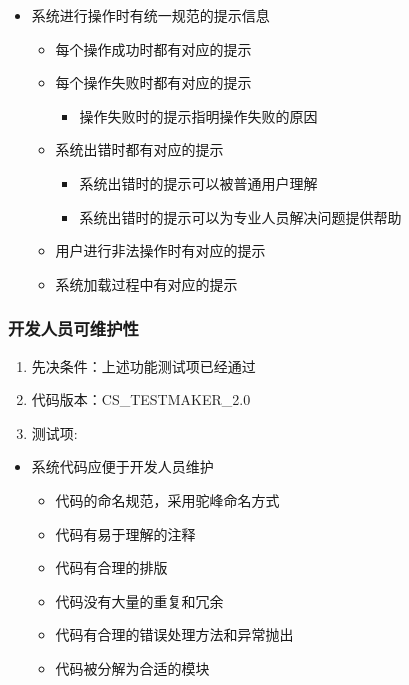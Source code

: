 \documentclass[hyperref, a4paper]{ctexart}
\providecommand{\tightlist}{%
  \setlength{\itemsep}{0pt}\setlength{\parskip}{0pt}}
\begin{document}
\begin{itemize}
\tightlist
\item
  系统进行操作时有统一规范的提示信息

  \begin{itemize}
  \tightlist
  \item
    每个操作成功时都有对应的提示
  \item
    每个操作失败时都有对应的提示

    \begin{itemize}
    \tightlist
    \item
      操作失败时的提示指明操作失败的原因
    \end{itemize}
  \item
    系统出错时都有对应的提示

    \begin{itemize}
    \tightlist
    \item
      系统出错时的提示可以被普通用户理解
    \item
      系统出错时的提示可以为专业人员解决问题提供帮助
    \end{itemize}
  \item
    用户进行非法操作时有对应的提示
  \item
    系统加载过程中有对应的提示
  \end{itemize}
\end{itemize}

\hypertarget{ux5f00ux53d1ux4ebaux5458ux53efux7ef4ux62a4ux6027}{%
\subsubsection{开发人员可维护性}\label{ux5f00ux53d1ux4ebaux5458ux53efux7ef4ux62a4ux6027}}

\begin{enumerate}
\def\labelenumi{\arabic{enumi}.}
\tightlist
\item
  先决条件：上述功能测试项已经通过
\item
  代码版本：CS\_TESTMAKER\_2.0
\item
  测试项:
\end{enumerate}

\begin{itemize}
\tightlist
\item
  系统代码应便于开发人员维护

  \begin{itemize}
  \tightlist
  \item
    代码的命名规范，采用驼峰命名方式
  \item
    代码有易于理解的注释
  \item
    代码有合理的排版
  \item
    代码没有大量的重复和冗余
  \item
    代码有合理的错误处理方法和异常抛出
  \item
    代码被分解为合适的模块
  \end{itemize}
\end{itemize}
\end{document}
